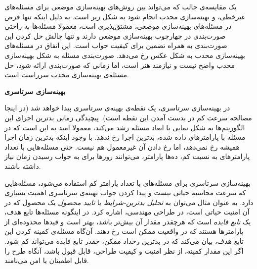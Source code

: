 
یک مقایسه‌ی جالب که می‌تواند بین روش‌های بهینه‌سازی موضعی برای مسئله‌های غیرخطی، و بهینه‌سازی محدب انجام شود به شکل زیر است. به دلیل اینکه تنها فرض در مسئله‌های بهینه‌سازی موضعی، مشتق‌پذیری است، معمولا مسئله‌ها به راحتی صورت‌بندی در چهارچوب بهینه‌سازی موضعی دارند و تنها چالش حل کردن این صورت‌بندی به همراه تضمین برای کیفیت جواب است. این اتفاق در مسئله‌های بهینه‌سازی محدب به شکل عکس رخ می‌دهد. صورت‌بندی مسئله به شکل بهینه‌سازی محدب واضح نیست و نیازمند هنر است، اما زمانی که صورت‌بندی ارائه شود، حل مسئله‌ی بهینه‌سازی محدب سرراست است.



\textbf{
بهینه‌سازی سرتاسری
}

در بهینه‌سازی سرتاسری، یک نقطه‌ی بهینه‌ی سرتاسری پیدا خواهد شد (در اینجا مصالحه سرعت کم در بدست آمدن این نقطه است). پیچیدگی زمانی بدترین اجرای این الگوریتم‌ها به شکل نمایی با ابعاد مسئله رشد می‌کند، معمولا امید به این است که در مسئله با پارامترهای داده شده، بدترین اجرا رخ ندهد. با وجود اینکه بدترین زمان اجرا همیشه رخ نمی‌دهد، اما رخ دادن آن غیرمعمول هم نیست. حتی مسئله‌هایی با تعداد پارامترهای به نسبت کم، ده‌ها پارامتر، می‌توانند روزها برای به جواب رسیدن زمان نیاز داشته باشند.


بهینه‌سازی سرتاسری برای مسئله‌های با تعداد پارامتر کم استفاده می‌شود، مسئله‌هایی که سرعت محاسبه حیاتی نیست و پیدا کردن جواب بهینه‌ی سرتاسری اهمیت بسیاری دارد. به عنوان مثال می‌توان به 
\textit{
تحلیل بدترین-شرایط
}  
یا 
\textit{
تایید محصول
}  
یک محصول که در آن امنیت حیاتی است، در طراحی مهندسی، اشاره کرد. در اینگونه مسئله‌ها تابع هدف، یک 
\textit{
تابع فایده
}  
است که هرچقدر مقدار آن بیش‌تر باشد، بهتر است و قیدها محدوده‌ای از پارامترها هستند که در واقعیت ممکن است رخ دهند. آن‌گاه مسئله‌ی کمینه کردن این تابع هدف، بیان می‌کند که در بدترین رخداد ممکن، چقدر تابع فایده می‌تواند کم شود. اگر این مقدار کمینه، از نظر امنیت و کیفیت طراحی، قابل قبول باشد، آنگاه طرح را قابل اطمینان یا امن می‌نامند.


